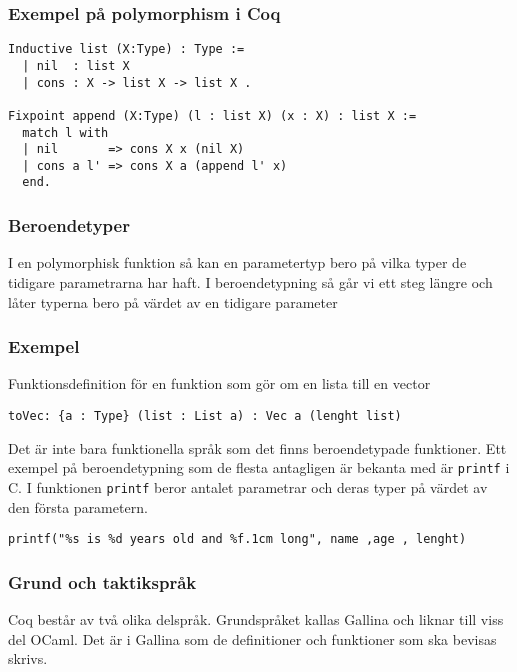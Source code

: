 \subsubsection{Exempel på polymorphism i Coq}
\begin{verbatim}
Inductive list (X:Type) : Type :=
  | nil  : list X
  | cons : X -> list X -> list X .

Fixpoint append (X:Type) (l : list X) (x : X) : list X :=
  match l with
  | nil       => cons X x (nil X)
  | cons a l' => cons X a (append l' x)
  end.
\end{verbatim}

\subsubsection{Beroendetyper}
I en polymorphisk funktion så kan en parametertyp bero på vilka
typer de tidigare parametrarna har haft. I beroendetypning så
går vi ett steg längre och låter typerna bero på värdet av en
tidigare parameter

\subsubsection{Exempel}
Funktionsdefinition för en funktion som gör om en lista till en vector
\begin{verbatim}
toVec: {a : Type} (list : List a) : Vec a (lenght list)
\end{verbatim}

Det är inte bara funktionella språk som det finns beroendetypade funktioner.
Ett exempel på beroendetypning som de flesta antagligen är bekanta
med är \texttt{printf} i C. I funktionen \texttt{printf} beror antalet
parametrar och deras typer på värdet av den första parametern.

\begin{verbatim}
printf("%s is %d years old and %f.1cm long", name ,age , lenght)
\end{verbatim}

\begin{comment}
CoqArt
http://mattam.org/research/publications/Programming_with_Dependent_Types_in_Coq-PPS-260209.pdf
** DONE Grund och taktikspråk
   CLOSED: [2013-05-10 fre 10:41]
\end{comment}


\subsubsection{Grund och taktikspråk}
Coq består av två olika delspråk. Grundspråket kallas
Gallina och liknar till viss del OCaml. Det är i Gallina som
de definitioner och funktioner som ska bevisas skrivs.

